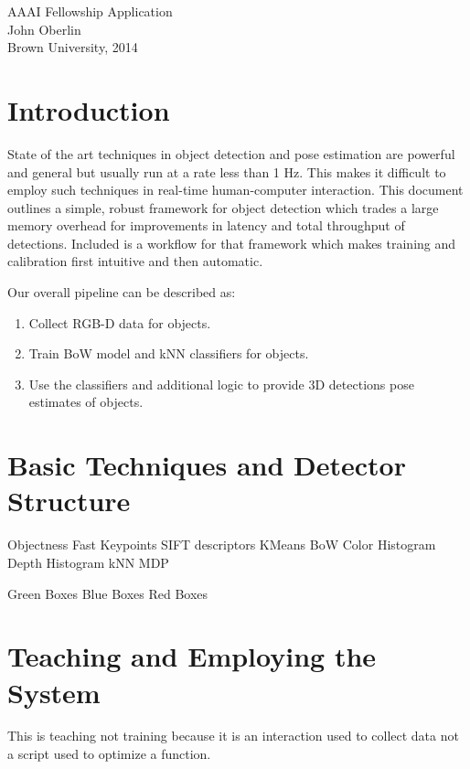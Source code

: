 \documentclass[12pt]{article}
\numberwithin{equation}{section}
\numberwithin{table}{section}
\numberwithin{figure}{section}
\begin{document}



\begin{center}
\textbf{\Large }AAAI Fellowship Application\\[6pt] 
John Oberlin\\
Brown University, 2014\\
\end{center}

\section{Introduction}

State of the art techniques in object detection and pose estimation
are powerful and general but usually run at a rate less than 1 Hz. This makes
it difficult to employ such techniques in real-time human-computer interaction.
This document outlines a simple, robust framework for object detection which 
trades a large memory overhead for improvements in latency and total throughput 
of detections. Included is a workflow for that framework which makes training
and calibration first intuitive and then automatic.

Our overall pipeline can be described as:

\begin{enumerate}
  \item Collect RGB-D data for objects.
  \item Train BoW model and kNN classifiers for objects.
  \item Use the classifiers and additional logic to provide 3D detections pose estimates of objects.
\end{enumerate}

\section{Basic Techniques and Detector Structure}

Objectness
Fast Keypoints
SIFT descriptors
KMeans
BoW
Color Histogram
Depth Histogram
kNN
MDP

Green Boxes
Blue Boxes
Red Boxes

\section{Teaching and Employing the System}
This is teaching not training because it is an interaction used to collect
data not a script used to optimize a function.
\end{document}
